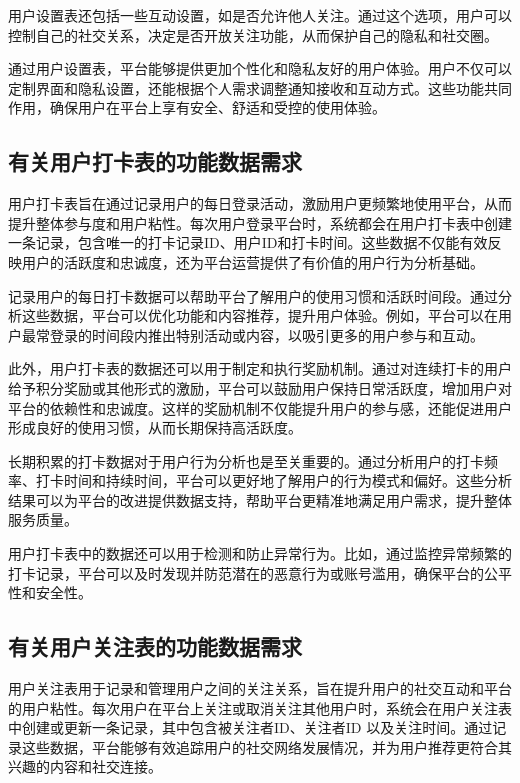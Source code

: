用户设置表还包括一些互动设置，如是否允许他人关注。通过这个选项，用户可以控制自己的社交关系，决定是否开放关注功能，从而保护自己的隐私和社交圈。

通过用户设置表，平台能够提供更加个性化和隐私友好的用户体验。用户不仅可以定制界面和隐私设置，还能根据个人需求调整通知接收和互动方式。这些功能共同作用，确保用户在平台上享有安全、舒适和受控的使用体验。

\subsection{有关用户打卡表的功能数据需求}

用户打卡表旨在通过记录用户的每日登录活动，激励用户更频繁地使用平台，从而提升整体参与度和用户粘性。每次用户登录平台时，系统都会在用户打卡表中创建一条记录，包含唯一的打卡记录ID、用户ID和打卡时间。这些数据不仅能有效反映用户的活跃度和忠诚度，还为平台运营提供了有价值的用户行为分析基础。

记录用户的每日打卡数据可以帮助平台了解用户的使用习惯和活跃时间段。通过分析这些数据，平台可以优化功能和内容推荐，提升用户体验。例如，平台可以在用户最常登录的时间段内推出特别活动或内容，以吸引更多的用户参与和互动。

此外，用户打卡表的数据还可以用于制定和执行奖励机制。通过对连续打卡的用户给予积分奖励或其他形式的激励，平台可以鼓励用户保持日常活跃度，增加用户对平台的依赖性和忠诚度。这样的奖励机制不仅能提升用户的参与感，还能促进用户形成良好的使用习惯，从而长期保持高活跃度。

长期积累的打卡数据对于用户行为分析也是至关重要的。通过分析用户的打卡频率、打卡时间和持续时间，平台可以更好地了解用户的行为模式和偏好。这些分析结果可以为平台的改进提供数据支持，帮助平台更精准地满足用户需求，提升整体服务质量。

用户打卡表中的数据还可以用于检测和防止异常行为。比如，通过监控异常频繁的打卡记录，平台可以及时发现并防范潜在的恶意行为或账号滥用，确保平台的公平性和安全性。

\subsection{有关用户关注表的功能数据需求}

用户关注表用于记录和管理用户之间的关注关系，旨在提升用户的社交互动和平台的用户粘性。每次用户在平台上关注或取消关注其他用户时，系统会在用户关注表中创建或更新一条记录，其中包含被关注者ID、关注者ID 以及关注时间。通过记录这些数据，平台能够有效追踪用户的社交网络发展情况，并为用户推荐更符合其兴趣的内容和社交连接。

